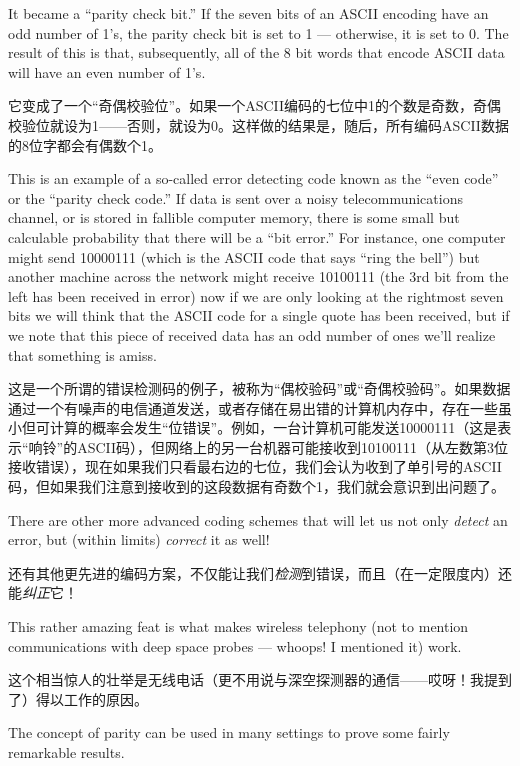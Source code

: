 It became a ``parity check bit.''  If the
seven bits of an ASCII encoding have an odd number of 1's, the parity
check bit is set to 1 --- otherwise, it is set to 0.  The result of this
is that, subsequently, all of the 8 bit words that encode ASCII data will have
an even number of 1's.

它变成了一个“奇偶校验位”。如果一个ASCII编码的七位中1的个数是奇数，奇偶校验位就设为1——否则，就设为0。这样做的结果是，随后，所有编码ASCII数据的8位字都会有偶数个1。

This is an example of a so-called  error detecting
code known as the ``even code'' or the ``parity check code.''  If 
data is sent over a noisy telecommunications channel, or is stored in
fallible computer memory, there is some small but calculable probability
that there will be a ``bit error.''   For instance, one computer might
send 10000111 (which is the ASCII code that says ``ring the bell'') but
another machine across the network might receive 10100111 (the 3rd bit from 
the left has been received in error) now if we are only looking at the 
rightmost seven bits we will think that the ASCII code for a single quote
has been received, but if we note that this piece of received data has an
odd number of ones we'll realize that something is amiss.

这是一个所谓的错误检测码的例子，被称为“偶校验码”或“奇偶校验码”。如果数据通过一个有噪声的电信通道发送，或者存储在易出错的计算机内存中，存在一些虽小但可计算的概率会发生“位错误”。例如，一台计算机可能发送10000111（这是表示“响铃”的ASCII码），但网络上的另一台机器可能接收到10100111（从左数第3位接收错误），现在如果我们只看最右边的七位，我们会认为收到了单引号的ASCII码，但如果我们注意到接收到的这段数据有奇数个1，我们就会意识到出问题了。

There are other
more advanced coding schemes that will let us not only \emph{detect} an
error, but (within limits) \emph{correct} it as well!

还有其他更先进的编码方案，不仅能让我们\emph{检测}到错误，而且（在一定限度内）还能\emph{纠正}它！

This rather amazing
feat is what makes wireless telephony (not to mention communications
with deep space probes --- whoops! I mentioned it) work.

这个相当惊人的壮举是无线电话（更不用说与深空探测器的通信——哎呀！我提到了）得以工作的原因。

The concept of parity can be used in many settings to prove some
fairly remarkable results.

